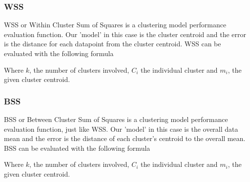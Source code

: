 \subsubsection*{WSS}
WSS or  Within Cluster Sum of Squares is a clustering model performance evaluation function. Our 'model' in this case is the cluster centroid and the error is the distance for each datapoint from the cluster centroid. WSS can be evaluated with the following formula\cite{???}

Where $k$, the number of clusters involved, $C_i$ the individual cluster and $m_i$, the given cluster centroid.
\subsubsection*{BSS}
BSS or  Between Cluster Sum of Squares is a clustering model performance evaluation function, just like WSS. Our 'model' in this case is the overall data mean and the error is the distance of each cluster's centroid to the overall mean. BSS can be evaluated with the following formula\cite{???}

Where $k$, the number of clusters involved, $C_i$ the individual cluster and $m_i$, the given cluster centroid.
